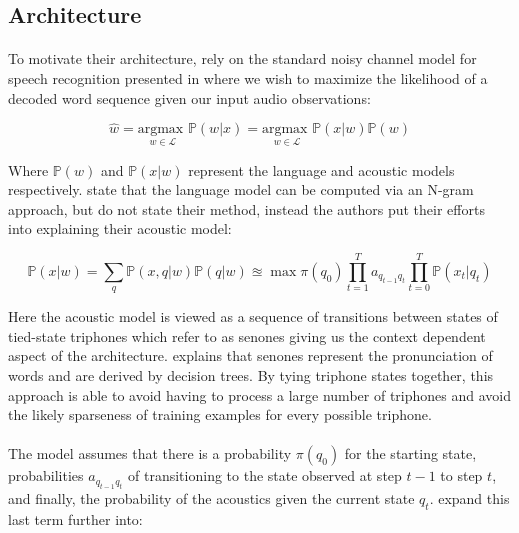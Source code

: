 \documentclass[letterpaper]{article}
\newcommand{\argmax}[1]{\underset{#1}{\text{argmax }}}
\newcommand{\cprob}[2]{ \prob{#1 \lvert #2} }
\newcommand{\prob}[1]{\mathbb{P}\left( #1 \right)}
\begin{document}
\subsection*{Architecture}

\paragraph{} To motivate their architecture, \cite{DBLP:journals/taslp/DahlYDA12} rely on the standard noisy channel model for speech recognition presented in \cite{jurafskyMartin} where we wish to maximize the likelihood of a decoded word sequence given our input audio observations:

\begin{equation}
\hat{w} = \argmax{w \in \mathscr{L}} \cprob{w}{x} = \argmax{w \in \mathscr{L}} \cprob{x}{w} \prob{w} 
\label{eqn:asr:def}
\end{equation}

Where $\prob{w}$ and $\cprob{x}{w}$ represent the language and acoustic models respectively. \cite{jurafskyMartin} state that the language model can be computed via an N-gram approach, but \cite{DBLP:journals/taslp/DahlYDA12} do not state their method, instead the authors put their efforts into explaining their acoustic model:

\begin{equation}
\cprob{x}{w} = \sum_{q} \cprob{x,q}{w} \cprob{q}{w} \approxeq \max \pi(q_0) \prod_{t = 1}^T a_{q_{t-1} q_t} \prod_{t=0}^T \cprob{x_t}{q_t} 
\label{eqn:lm:def}
\end{equation}

Here the acoustic model is viewed as a sequence of transitions between states of tied-state triphones which \cite{DBLP:journals/taslp/DahlYDA12} refer to as senones giving us the context dependent aspect of the architecture. \cite{DBLP:conf/interspeech/FerrerLMS14} explains that senones represent the pronunciation of words and are derived by decision trees. By tying triphone states together, this approach is able to avoid having to process a large number of triphones and avoid the likely sparseness of training examples for every possible triphone.

\paragraph{} The model assumes that there is a probability $\pi(q_0)$ for the starting state, probabilities $a_{q_{t-1} q_{t}}$ of transitioning to the state observed at step $t -1$ to step $t$, and finally, the probability of the acoustics given the current state $q_t$. \cite{DBLP:journals/taslp/DahlYDA12} expand this last term further into:
\end{document}
